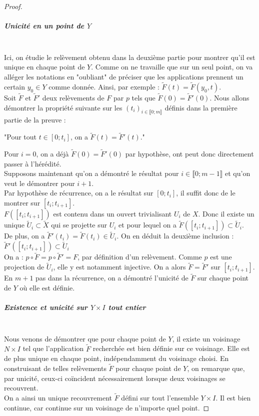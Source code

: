 \begin{proof}
			\subparagraph{Unicité en un point de $Y$}~\\
				Ici, on étudie le relèvement obtenu dans la deuxième partie pour montrer qu'il est unique en chaque point de $Y$. 
				Comme on ne travaille que sur un seul point, on va alléger les notations en "oubliant" de préciser que les 
				applications prennent un certain $y_{0}\in Y$ comme donnée. Ainsi, par exemple : 
				$\tilde{F}(t) = \tilde{F}(y_{0},t)$.\\
				Soit $\tilde{F}$ et $\tilde{F}'$ deux relèvements de $F$ par $p$ tels que $\tilde{F}(0)=\tilde{F}'(0)$. 
				Nous allons démontrer la propriété suivante sur les $(t_{i})_{i\in\llbracket0;m\rrbracket}$ 
				définis dans la première partie de la preuve :
				\begin{center}
					"Pour tout $t\in[0;t_{i}]$, on a $\tilde{F}(t)=\tilde{F}'(t)$."
				\end{center}
				Pour $i=0$, on a déjà $\tilde{F}(0)=\tilde{F}'(0)$ par hypothèse, ont peut donc directement passer à l'hérédité.\\
				Supposons maintenant qu'on a démontré le résultat pour $i\in\llbracket0;m-1\rrbracket$ 
				et qu'on veut le démontrer pour $i+1$.\\
				Par hypothèse de récurrence, on a le résultat sur $[0;t_{i}]$, il suffit donc de le montrer sur $[t_{i};t_{i+1}]$.\\
				$F([t_{i};t_{i+1}])$ est contenu dans un ouvert trivialisant $U_{i}$ de $X$. Donc il existe un unique 
				$\tilde{U}_{i}\subset \tilde{X}$ qui se projette sur $U_{i}$ et pour lequel on a 
				$\tilde{F}([t_{i};t_{i+1}]) \subset \tilde{U}_{i}$.\\
				De plus, on a  $\tilde{F}'(t_{i})=\tilde{F}(t_{i})\in \tilde{U}_{i}$. On en déduit la deuxième inclusion : 
				$\tilde{F}'([t_{i};t_{i+1}]) \subset \tilde{U}_{i}$\\
				On a : $p\circ\tilde{F}=p\circ\tilde{F}'=F$, par définition d'un relèvement. Comme $p$ est une projection de 
				$\tilde{U}_{i}$, elle y est notamment injective. On a alors $\tilde{F}=\tilde{F}'$ sur $[t_{i};t_{i+1}]$.\\
				En $m+1$ pas dans la récurrence, on a démontré l'unicité de $\tilde{F}$ sur chaque point de $Y$ où elle est définie.
\pagebreak
			\subparagraph{Existence et unicité sur $Y\times I$ tout entier}~\\
				Nous venons de démontrer que pour chaque point de $Y$, il existe un voisinage $N\times I$ tel que l'application 
				$\tilde{F}$ recherchée est bien définie sur ce voisinage. Elle est de plus unique en chaque point, 
				indépendamment du voisinage choisi. En construisant de telles relèvements $\tilde{F}$ pour chaque point de $Y$, 
				on remarque que, par unicité, ceux-ci coïncident nécessairement lorsque deux voisinages se recouvrent.\\
				On a ainsi un unique recouvrement $\tilde{F}$ défini sur tout l'ensemble $Y\times I$. 
				Il est bien continue, car continue sur un voisinage de n'importe quel point.
		\end{proof}
		
